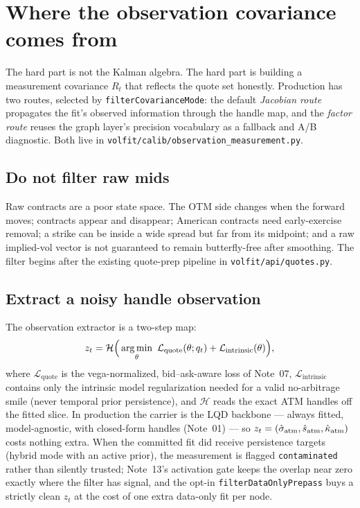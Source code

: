 \documentclass[11pt]{article}
\newcommand{\calL}{\mathcal L}
\newcommand{\calH}{\mathcal H}
\begin{document}
\section{Where the observation covariance comes from}
\label{sec:measurement}

The hard part is not the Kalman algebra. The hard part is building a
measurement covariance $R_t$ that reflects the quote set honestly. Production
has two routes, selected by \texttt{filterCovarianceMode}: the default
\emph{Jacobian route} propagates the fit's observed information through the
handle map, and the \emph{factor route} reuses the graph layer's precision
vocabulary as a fallback and A/B diagnostic. Both live in
\texttt{volfit/calib/observation\_measurement.py}.

\subsection{Do not filter raw mids}

Raw contracts are a poor state space. The OTM side changes when the forward
moves; contracts appear and disappear; American contracts need early-exercise
removal; a strike can be inside a wide spread but far from its midpoint; and a
raw implied-vol vector is not guaranteed to remain butterfly-free after
smoothing. The filter begins after the existing quote-prep pipeline in
\texttt{volfit/api/quotes.py}.

\subsection{Extract a noisy handle observation}

The observation extractor is a two-step map:
\begin{equation}
z_t=\calH\Big(\argmin_\theta\
\calL_{\mathrm{quote}}(\theta;q_t)+\calL_{\mathrm{intrinsic}}(\theta)\Big),
\label{eq:extract}
\end{equation}
where $\calL_{\mathrm{quote}}$ is the vega-normalized, bid--ask-aware loss of
Note~07, $\calL_{\mathrm{intrinsic}}$ contains only the intrinsic model
regularization needed for a valid no-arbitrage smile (never temporal prior
persistence), and $\calH$ reads the exact ATM handles off the fitted slice. In
production the carrier is the LQD backbone --- always fitted, model-agnostic,
with closed-form handles (Note~01) --- so
$z_t=(\hat\sigma_{\mathrm{atm}},\hat s_{\mathrm{atm}},\hat\kappa_{\mathrm{atm}})$ costs nothing extra.
When the committed fit did receive persistence targets (hybrid mode with an
active prior), the measurement is flagged \texttt{contaminated} rather than
silently trusted; Note~13's activation gate keeps the overlap near zero
exactly where the filter has signal, and the opt-in
\texttt{filterDataOnlyPrepass} buys a strictly clean $z_t$ at the cost of one
extra data-only fit per node.
\end{document}
